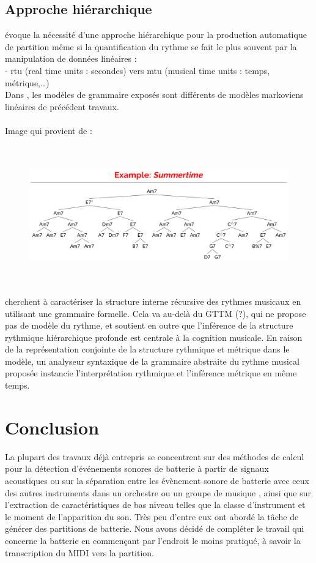 \subsection*{Approche hiérarchique}
\cite{foscarin:hal-01988990} évoque la nécessité d’une approche hiérarchique pour la production automatique de partition même si la quantification du rythme se fait le plus souvent par la manipulation de données linéaires :\\
- rtu (real time units : secondes) vers mtu (musical time units : temps, métrique,…)\\
Dans \cite{foscarin:hal-01988990}, les modèles de grammaire exposés sont différents de modèles markoviens linéaires de précédent travaux.\\\\
Image qui provient de \cite{harasimjazz} :\\
\begin{figure}[h]
	\centering
	\includegraphics[height=60mm, width=125mm]{z_images/2_etat_de_l_art/summertime_tree.png}
\end{figure}

\cite{rohrmeier2020towards} cherchent à caractériser la structure interne récursive des rythmes musicaux en utilisant une grammaire formelle.
Cela va au-delà du GTTM (?), qui ne propose pas de modèle du rythme, et soutient en outre que l'inférence de la structure rythmique hiérarchique profonde est centrale à la cognition musicale. En raison de la représentation conjointe de la structure rythmique et métrique dans le modèle, un analyseur syntaxique de la grammaire abstraite du rythme musical proposée instancie l'interprétation rythmique et l'inférence métrique en même temps.
\section*{Conclusion}
La plupart des travaux déjà entrepris se concentrent sur des méthodes de calcul pour la détection d'événements sonores de batterie à partir de signaux acoustiques ou sur la séparation entre les évènement sonore de batterie avec ceux des autres instruments dans un orchestre ou un groupe de musique \cite{2802}, ainsi que sur l'extraction de caractéristiques de bas niveau telles que la classe d'instrument et le moment de l'apparition du son. Très peu d'entre eux ont abordé la tâche de générer des partitions de batterie.
Nous avons décidé de compléter le travail qui concerne la batterie en commençant par l’endroit le moins pratiqué, à savoir la transcription du MIDI vers la partition.
